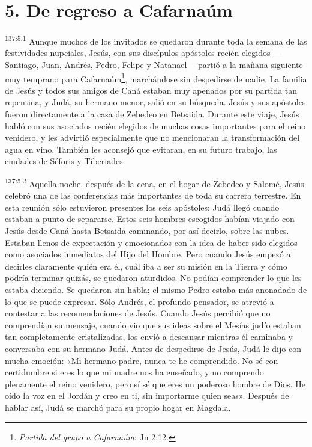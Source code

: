 \section*{5. De regreso a Cafarnaúm}
\par 
\textsuperscript{137:5.1} Aunque muchos de los invitados se quedaron durante toda la semana de las festividades nupciales, Jesús, con sus discípulos-apóstoles recién elegidos ---Santiago, Juan, Andrés, Pedro, Felipe y Natanael--- partió a la mañana siguiente muy temprano para Cafarnaúm\footnote{\textit{Partida del grupo a Cafarnaúm}: Jn 2:12.}, marchándose sin despedirse de nadie. La familia de Jesús y todos sus amigos de Caná estaban muy apenados por su partida tan repentina, y Judá, su hermano menor, salió en su búsqueda. Jesús y sus apóstoles fueron directamente a la casa de Zebedeo en Betsaida. Durante este viaje, Jesús habló con sus asociados recién elegidos de muchas cosas importantes para el reino venidero, y les advirtió especialmente que no mencionaran la transformación del agua en vino. También les aconsejó que evitaran, en su futuro trabajo, las ciudades de Séforis y Tiberiades.

\par 
\textsuperscript{137:5.2} Aquella noche, después de la cena, en el hogar de Zebedeo y Salomé, Jesús celebró una de las conferencias más importantes de toda su carrera terrestre. En esta reunión sólo estuvieron presentes los seis apóstoles; Judá llegó cuando estaban a punto de separarse. Estos seis hombres escogidos habían viajado con Jesús desde Caná hasta Betsaida caminando, por así decirlo, sobre las nubes. Estaban llenos de expectación y emocionados con la idea de haber sido elegidos como asociados inmediatos del Hijo del Hombre. Pero cuando Jesús empezó a decirles claramente quién era él, cuál iba a ser su misión en la Tierra y cómo podría terminar quizás, se quedaron aturdidos. No podían comprender lo que les estaba diciendo. Se quedaron sin habla; el mismo Pedro estaba más anonadado de lo que se puede expresar. Sólo Andrés, el profundo pensador, se atrevió a contestar a las recomendaciones de Jesús. Cuando Jesús percibió que no comprendían su mensaje, cuando vio que sus ideas sobre el Mesías judío estaban tan completamente cristalizadas, los envió a descansar mientras él caminaba y conversaba con su hermano Judá. Antes de despedirse de Jesús, Judá le dijo con mucha emoción: «Mi hermano-padre, nunca te he comprendido. No sé con certidumbre si eres lo que mi madre nos ha enseñado, y no comprendo plenamente el reino venidero, pero sí sé que eres un poderoso hombre de Dios. He oído la voz en el Jordán y creo en ti, sin importarme quien seas». Después de hablar así, Judá se marchó para su propio hogar en Magdala.

